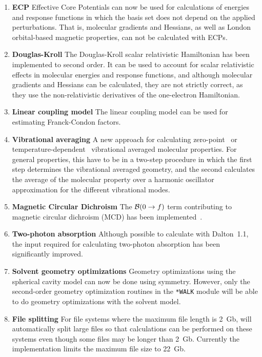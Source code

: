 \begin{enumerate}
\item {\bf ECP} Effective Core Potentials can now be used for calculations
of energies and response functions in which the basis set does not
depend on the applied perturbations. That is, molecular gradients and
Hessians, as well as London orbital-based magnetic properties, can not
be calculated with ECPs.

\item {\bf Douglas-Kroll} The Douglas-Kroll scalar relativistic Hamiltonian
has been implemented to second order. It can be used to account for
scalar relativistic effects in molecular energies and response
functions, and although molecular gradients and Hessians can be
calculated, they are not strictly correct, as they use the
non-relativistic derivatives of the one-electron Hamiltonian.

\item {\bf Linear coupling model} The linear coupling model can be used for
estimating Franck-Condon factors.

\item  {\bf Vibrational averaging} A new approach for calculating
zero-point~\cite{poakrprtjcp112,krpoaprtjcp112} or
tem\-pera\-ture-dependent~\cite{krjljv} vibrational averaged molecular
properties. For general properties, this have to be in a two-step
procedure in which the first step determines the vibrational averaged
geometry, and the second calculates the average of the molecular
property over a harmonic oscillator approximation for the different
vibrational modes.

\item {\bf Magnetic Circular Dichroism} The ${\cal{B}}(0\rightarrow f)$ term
contributing to
magnetic circular dichroism (MCD) has been
implemented~\cite{Coriani:MCDRSP}.

\item {\bf Two-photon absorption} Although possible to calculate with
Dalton~1.1, the input required for calculating two-photon absorption
has been significantly improved.

\item{\bf Solvent geometry optimizations} Geometry optimizations using
the spherical cavity model can now be done using symmetry. However,
only the second-order geometry optimization routines in the
\verb|*WALK| module will be able to do geometry optimizations with the
solvent model.

\item {\bf File splitting} For file systems where the maximum file length is
2~Gb, {\dalton} will automatically split large files  so that
calculations can be performed on these systems even though some files
may be longer than 2~Gb. Currently the implementation limits the
maximum file size to 22~Gb.


\end{enumerate}
